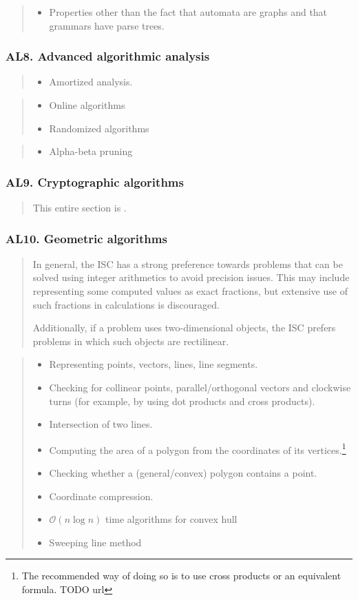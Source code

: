 \documentclass[a4paper,11pt,oneside]{article}
\newcommand{\cmark}{\ding{51}}%
\newcommand{\xmark}{\ding{55}}%
\newcommand{\Ccodeonly}{{\small\cmark\faFileText}}
\newcommand{\Cnofocus}{{\small\faQuestion}}
\newcommand{\Cexcluded}{{\small\xmark}}
\newcommand{\Icodeonly}{\item[\hbox to 1.8em{\Ccodeonly\hfill}]}
\newcommand{\Inofocus}{\item[\hbox to 1.8em{\Cnofocus\hfill}]}
\newcommand{\Iexcluded}{\item[\hbox to 1.8em{\Cexcluded\hfill}]}
\newenvironment{myitemize}{\begin{quote}\begin{itemize}\itemsep 0pt}{\end{itemize}\end{quote}}
\begin{document}
    \begin{myitemize}
    \Iexcluded Properties other than the fact that automata are graphs and that grammars have parse trees.
    \end{myitemize}
  
    \subsubsection*{AL8. Advanced algorithmic analysis}%

    \begin{myitemize}
    \Icodeonly Amortized analysis.
    \end{myitemize}

    \begin{myitemize}
    \Inofocus Online algorithms
    \Inofocus Randomized algorithms
    \end{myitemize}

    \begin{myitemize}
    \Iexcluded Alpha-beta pruning
    \end{myitemize}
    
    \subsubsection*{AL9. Cryptographic algorithms}%

    \begin{quote}
    This entire section is \Cnofocus.
    \end{quote}

    \subsubsection*{AL10. Geometric algorithms}%

    \begin{quote}
    In general, the ISC has a strong preference towards problems that can be solved using integer
    arithmetics to avoid precision issues. This may include representing some computed values as 
    exact fractions, but extensive use of such fractions in calculations is discouraged.

    Additionally, if a problem uses two-dimensional objects, the ISC prefers problems in which such objects are rectilinear.
    \end{quote}

    \begin{myitemize}
    \Icodeonly Representing points, vectors, lines, line segments.
    \Icodeonly Checking for collinear points, parallel/orthogonal vectors and clockwise turns (for example, by using dot products and cross products).
    \Icodeonly Intersection of two lines.
    \Icodeonly Computing the area of a polygon from the coordinates of its vertices.\footnote{The recommended way of doing so is to use cross products or an equivalent formula. TODO url}
    \Icodeonly Checking whether a (general/convex) polygon contains a point.
    \Icodeonly Coordinate compression.
    \Icodeonly $\mathcal{O}(n\log{n})$ time algorithms for convex hull
    \Icodeonly Sweeping line method
    \end{myitemize}
  
\end{document}
